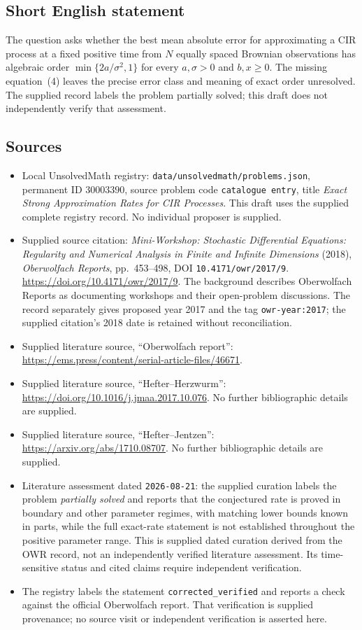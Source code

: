 \documentclass[11pt]{article}
\begin{document}
\subsection{Short English statement}
The question asks whether the best mean absolute error for approximating a CIR process at a fixed positive time from \(N\) equally spaced Brownian observations has algebraic order \(\min\{2a/\sigma^2,1\}\) for every \(a,\sigma>0\) and \(b,x\geq0\). The missing equation~(4) leaves the precise error class and meaning of exact order unresolved. The supplied record labels the problem partially solved; this draft does not independently verify that assessment.
\subsection{Sources}
\begin{itemize}
\item Local UnsolvedMath registry: \texttt{data/unsolvedmath/problems.json}, permanent ID \(30003390\), source problem code \texttt{catalogue entry}, title \emph{Exact Strong Approximation Rates for CIR Processes}. This draft uses the supplied complete registry record. No individual proposer is supplied.
\item Supplied source citation: \emph{Mini-Workshop: Stochastic Differential Equations: Regularity and Numerical Analysis in Finite and Infinite Dimensions} (2018), \emph{Oberwolfach Reports}, pp.~453--498, DOI \texttt{10.4171/owr/2017/9}. \url{https://doi.org/10.4171/owr/2017/9}. The background describes Oberwolfach Reports as documenting workshops and their open-problem discussions. The record separately gives proposed year 2017 and the tag \texttt{owr-year:2017}; the supplied citation's 2018 date is retained without reconciliation.
\item Supplied literature source, ``Oberwolfach report'': \url{https://ems.press/content/serial-article-files/46671}.
\item Supplied literature source, ``Hefter--Herzwurm'': \url{https://doi.org/10.1016/j.jmaa.2017.10.076}. No further bibliographic details are supplied.
\item Supplied literature source, ``Hefter--Jentzen'': \url{https://arxiv.org/abs/1710.08707}. No further bibliographic details are supplied.
\item Literature assessment dated \texttt{2026-08-21}: the supplied curation labels the problem \emph{partially solved} and reports that the conjectured rate is proved in boundary and other parameter regimes, with matching lower bounds known in parts, while the full exact-rate statement is not established throughout the positive parameter range. This is supplied dated curation derived from the OWR record, not an independently verified literature assessment. Its time-sensitive status and cited claims require independent verification.
\item The registry labels the statement \texttt{corrected\_verified} and reports a check against the official Oberwolfach report. That verification is supplied provenance; no source visit or independent verification is asserted here.
\end{itemize}
\end{document}

